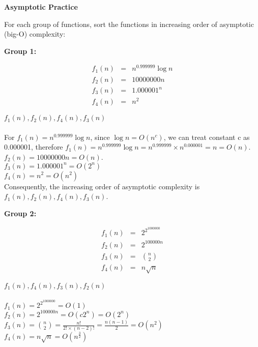 \documentclass[12pt,twoside]{article}
\begin{document}
\begin{problems}

\problem {} \textbf{Asymptotic Practice}

For each group of functions, sort the functions in increasing order of
asymptotic (big-O) complexity:

\begin{problemparts}

\problempart {} \textbf{Group 1:}

$$
\begin{array}{rcl}
f_1(n) &=& n^{0.999999} \log n \\
f_2(n) &=& 10000000 n \\
f_3(n) &=& 1.000001^n \\
f_4(n) &=& n^2
\end{array}
$$

\ifsolution \solution{}
{\color{blue}$f_1(n),f_2(n),f_4(n),f_3(n)$
\\
\\
For $f_1(n)= n^{0.999999} \log n$, since $\log n =O(n^c)$, we can treat constant c as 0.000001,
therefore $f_1(n)= n^{0.999999} \log n = n^{0.999999} \times n^{0.000001} = n = O(n)$.\\
$f_2(n) = 10000000 n=O(n)$.\\
$f_3(n) = 1.000001^n =O(2^n)$\\
$f_4(n) = n^2 = O(n^2)$\\
Consequently, the increasing order of asymptotic complexity is $f_1(n),f_2(n),f_4(n),f_3(n)$.}
\\
\fi

\problempart {} \textbf{Group 2:}

$$
\begin{array}{rcl}
f_1(n) &=& 2^{2^{1000000}} \\
f_2(n) &=& 2^{100000n} \\
f_3(n) &=& \displaystyle \binom{n}{2} \\
f_4(n) &=& n \sqrt{n}
\end{array}
$$

\ifsolution \solution{}
{\color{blue}$f_1(n),f_4(n),f_3(n),f_2(n)$
\\
\\
$f_1(n) = 2^{2^{1000000}} = O(1)$\\
$f_2(n) = 2^{100000n} = O(c2^{n}) = O(2^n)$\\
$f_3(n) = \displaystyle \binom{n}{2} = \frac{n!}{2!\times(n-2)!} = \frac{n(n-1)}{2} = O(n^2)$\\
$f_4(n) = n \sqrt{n} = O(n^{\frac{3}{2}})$

}
\end{problemparts}
\end{problems}
\end{document}
